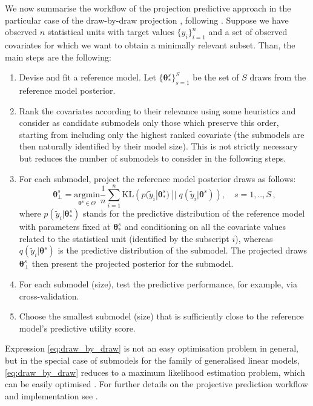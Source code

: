 \documentclass[american,]{article}
\theoremstyle{definition}
\begin{document}
We now summarise the workflow of the projection predictive approach in
the particular case of the draw-by-draw projection \cite[original
formulation by][]{paper:original_proj}, following
\cite{paper:projpred}. Suppose we have observed $n$ statistical units
with target values $\{y_{i}\}_{i=1}^{n}$ and a set of observed
covariates for which we want to obtain a minimally relevant
subset. Than, the main steps are the following:
\begin{enumerate}
\item Devise and fit a reference model. Let $\{\boldsymbol{\theta}_{*}^{s}\}_{s=1}^{S}$ be the set of $S$ draws from the reference model posterior.
\item Rank the covariates according to their relevance using some
  heuristics and consider as candidate submodels only those which
  preserve this order, starting from including only the highest ranked
  covariate (the submodels are then naturally identified by their
  model size). This is not strictly necessary but reduces the number
  of submodels to consider in the following steps.
\item For each submodel, project the reference model posterior draws as follows:
\begin{equation}\label{eq:draw_by_draw}
\boldsymbol{\theta}_{\perp}^{s} = \underset{\boldsymbol{\theta^{s}}\in\Theta}{\text{argmin}} \frac{1}{n}\sum_{i=1}^{n}\text{KL} \left( p(\tilde{y}_{i}|\boldsymbol{\theta}_{*}^{s})\;||\;q(\tilde{y}_{i}|\boldsymbol{\theta}^{s}) \right), \quad s=1,..,S \,,
\end{equation}
where $p(\tilde{y}_{i}|\boldsymbol{\theta}_{*}^{s})$ stands for the
predictive distribution of the reference model with parameters fixed
at $\boldsymbol{\theta}_{*}^{s}$ and conditioning on all the covariate
values related to the statistical unit (identified by the subscript
$i$), whereas $q(\tilde{y}_{i}|\boldsymbol{\theta}^{s})$ is the
predictive distribution of the submodel. The projected draws
$\boldsymbol{\theta}_{\perp}^{s}$ then present the projected posterior
for the submodel.
\item For each submodel (size), test the predictive performance, for example, via cross-validation.
\item Choose the smallest submodel (size) that is sufficiently close to the reference model's predictive utility score.
\end{enumerate} 

Expression \eqref{eq:draw_by_draw} is not an easy optimisation problem
in general, but in the special case of submodels for the family of
generalised linear models, \eqref{eq:draw_by_draw} reduces to a
maximum likelihood estimation problem, which can be easily optimised
\citep{paper:original_proj}. For further details on the projective
prediction workflow and implementation see \cite{paper:projpred}.
\end{document}
